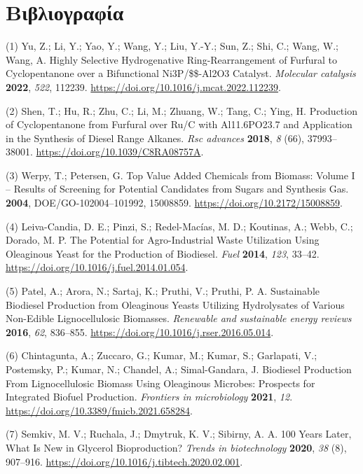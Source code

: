 \documentclass[11pt]{article}
\begin{document}
\pagebreak

\section{Βιβλιογραφία}
\label{sec:org704b232}
\hypertarget{citeproc_bib_item_1}{(1) Yu, Z.; Li, Y.; Yao, Y.; Wang, Y.; Liu, Y.-Y.; Sun, Z.; Shi, C.; Wang, W.; Wang, A. Highly Selective Hydrogenative Ring-Rearrangement of Furfural to Cyclopentanone over a Bifunctional Ni3P/\$\gamma\$-Al2O3 Catalyst. \textit{Molecular catalysis} \textbf{2022}, \textit{522}, 112239. \url{https://doi.org/10.1016/j.mcat.2022.112239}.}

\hypertarget{citeproc_bib_item_2}{(2) Shen, T.; Hu, R.; Zhu, C.; Li, M.; Zhuang, W.; Tang, C.; Ying, H. Production of Cyclopentanone from Furfural over Ru/C with Al11.6PO23.7 and Application in the Synthesis of Diesel Range Alkanes. \textit{Rsc advances} \textbf{2018}, \textit{8} (66), 37993–38001. \url{https://doi.org/10.1039/C8RA08757A}.}

\hypertarget{citeproc_bib_item_3}{(3) Werpy, T.; Petersen, G. Top Value Added Chemicals from Biomass: Volume I – Results of Screening for Potential Candidates from Sugars and Synthesis Gas. \textbf{2004}, DOE/GO-102004–101992, 15008859. \url{https://doi.org/10.2172/15008859}.}

\hypertarget{citeproc_bib_item_4}{(4) Leiva-Candia, D. E.; Pinzi, S.; Redel-Macías, M. D.; Koutinas, A.; Webb, C.; Dorado, M. P. The Potential for Agro-Industrial Waste Utilization Using Oleaginous Yeast for the Production of Biodiesel. \textit{Fuel} \textbf{2014}, \textit{123}, 33–42. \url{https://doi.org/10.1016/j.fuel.2014.01.054}.}

\hypertarget{citeproc_bib_item_5}{(5) Patel, A.; Arora, N.; Sartaj, K.; Pruthi, V.; Pruthi, P. A. Sustainable Biodiesel Production from Oleaginous Yeasts Utilizing Hydrolysates of Various Non-Edible Lignocellulosic Biomasses. \textit{Renewable and sustainable energy reviews} \textbf{2016}, \textit{62}, 836–855. \url{https://doi.org/10.1016/j.rser.2016.05.014}.}

\hypertarget{citeproc_bib_item_6}{(6) Chintagunta, A.; Zuccaro, G.; Kumar, M.; Kumar, S.; Garlapati, V.; Postemsky, P.; Kumar, N.; Chandel, A.; Simal-Gandara, J. Biodiesel Production From Lignocellulosic Biomass Using Oleaginous Microbes: Prospects for Integrated Biofuel Production. \textit{Frontiers in microbiology} \textbf{2021}, \textit{12}. \url{https://doi.org/10.3389/fmicb.2021.658284}.}

\hypertarget{citeproc_bib_item_7}{(7) Semkiv, M. V.; Ruchala, J.; Dmytruk, K. V.; Sibirny, A. A. 100 Years Later, What Is New in Glycerol Bioproduction? \textit{Trends in biotechnology} \textbf{2020}, \textit{38} (8), 907–916. \url{https://doi.org/10.1016/j.tibtech.2020.02.001}.}
\end{document}
